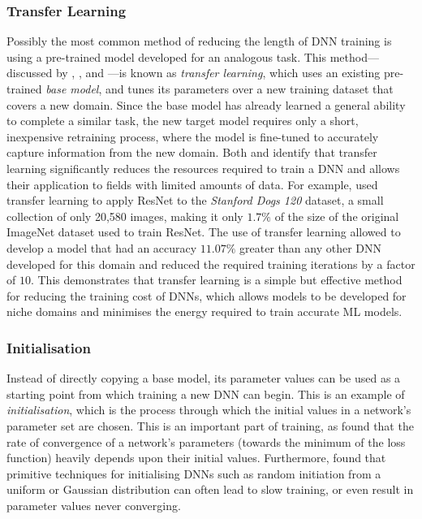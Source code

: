 \documentclass[a4paper, 11pt]{report}
\begin{document}
    \subsubsection{Transfer Learning}

    Possibly the most common method of reducing the length of DNN training is using a pre-trained model developed for an analogous task. This method---discussed by \citet{strubell-2019}, \citet{walsh-2021}, and \citet{schwartz-2019}---is known as \emph{transfer learning}, which uses an existing pre-trained \emph{base model}, and tunes its parameters over a new training dataset that covers a new domain. Since the base model has already learned a general ability to complete a similar task, the new target model requires only a short, inexpensive retraining process, where the model is fine-tuned to accurately capture information from the new domain. Both \citet{strubell-2019} and \citet{walsh-2021} identify that transfer learning significantly reduces the resources required to train a DNN and allows their application to fields with limited amounts of data. For example, \citet{wang-2020} used transfer learning to apply ResNet to the \emph{Stanford Dogs 120} dataset, a small collection of only 20,580 images, making it only $1.7\%$ of the size of the original ImageNet dataset used to train ResNet. The use of transfer learning allowed \citeauthor{wang-2020} to develop a model that had an accuracy $11.07\%$ greater than any other DNN developed for this domain and reduced the required training iterations by a factor of $10$. This demonstrates that transfer learning is a simple but effective method for reducing the training cost of DNNs, which allows models to be developed for niche domains and minimises the energy required to train accurate ML models.


    \subsubsection{Initialisation}

    Instead of directly copying a base model, its parameter values can be used as a starting point from which training a new DNN can begin. This is an example of \emph{initialisation}, which is the process through which the initial values in a network's parameter set are chosen. This is an important part of training, as \citet{xu-2021} found that the rate of convergence of a network's parameters (towards the minimum of the loss function) heavily depends upon their initial values. Furthermore, \citet{hanin-2018} found that primitive techniques for initialising DNNs such as random initiation from a uniform or Gaussian distribution can often lead to slow training, or even result in parameter values never converging.
\end{document}

